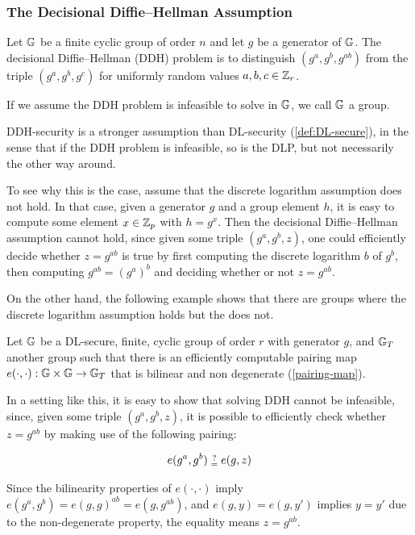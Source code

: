 \subsubsection{The Decisional Diffie--Hellman Assumption}
\label{def:DDH-secure}

\begin{definition}
Let $\mathbb{G}$ be a finite cyclic group of order $n$ and let $g$ be a generator of $\mathbb{G}$. The decisional Diffie--Hellman (DDH) problem is to distinguish $(g^a,g^b, g^{ab})$ from the triple $(g^a,g^b,g^c)$ for uniformly random values $a,b,c\in \mathbb{Z}_r$. 
\end{definition}

If we assume the DDH problem is infeasible to solve in $\mathbb{G}$, we call $\mathbb{G}$ a  group.

DDH-security is a stronger assumption than DL-security (\ref{def:DL-secure}), in the sense that if the DDH problem is infeasible, so is the DLP, but not necessarily the other way around.

To see why this is the case, assume that the discrete logarithm assumption does not hold. In that case, given a generator $g$ and a group element $h$, it is easy to compute some element $x\in\mathbb{Z}_p$ with $h=g^x$. Then the decisional Diffie--Hellman assumption cannot hold, since given some triple $(g^a , g^b , z )$, one could efficiently decide whether $z = g^{ab}$ is true by first computing the discrete logarithm $b$ of  $g^b$, then computing $g^{ab}= (g^a)^b$ and deciding whether or not $z=g^{ab}$.

On the other hand, the following example shows that there are groups where the discrete logarithm assumption holds but the  does not.

\begin{example}

Let $\mathbb{G}$ be a DL-secure, finite, cyclic group of order $r$ with generator $g$, and $\mathbb{G}_T$ another group such that there is an efficiently computable pairing map $e(\cdot,\cdot): \mathbb{G} \times \mathbb{G} \to \mathbb{G}_T$ that is bilinear and non degenerate (\ref{pairing-map}).

In a setting like this, it is easy to show that solving DDH cannot be infeasible, since, given some  triple $(g^a, g^b, z)$, it is possible to efficiently check whether $z = g^{ab}$ by making use of the following pairing:

\begin{equation}
e(g^a,g^b) \checkeq e(g,z)
\end{equation}

Since the bilinearity properties of $e(\cdot,\cdot)$ imply $e(g^a,g^b)= e(g,g)^{ab}= e(g,g^{ab})$, and $e(g,y)=e(g,y')$ implies $y=y'$ due to the non-degenerate property, the equality means $z=g^{ab}$.

\end{example}

